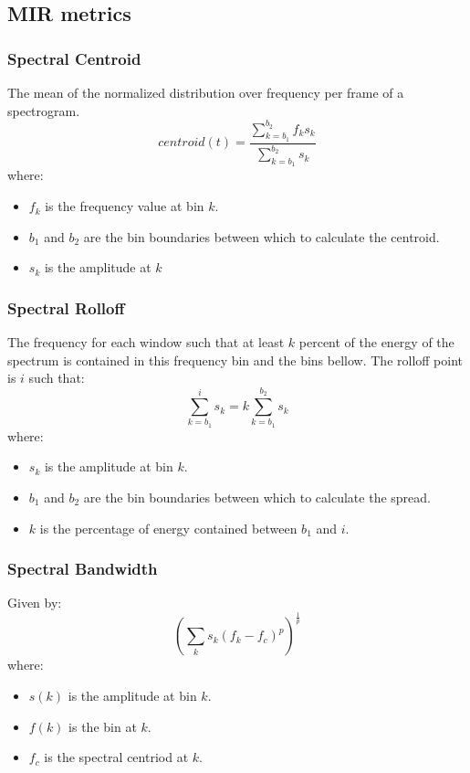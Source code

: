 \documentclass[a4paper, 12pt, twoside]{report}
\begin{document}
\subsection{MIR metrics} \label{mir}
\label{sec:org59595af}
\subsubsection{Spectral Centroid}
\label{sec:org722ed3e}

    The mean of the normalized distribution over frequency per frame of a spectrogram.
    \[ centroid(t) = \frac{\sum^{b_{2}}_{k=b_{1}}f_{k}s_{k}}{\sum^{b_{2}}_{k=b_{1}}s_{k}} \]
    where:
    \begin{itemize}
      \item $f_{k}$ is the frequency value at bin $k$.
      \item $b_{1}$ and $b_{2}$ are the bin boundaries between which to calculate the centroid.
      \item $s_{k}$ is the amplitude at $k$
    \end{itemize}

\subsubsection{Spectral Rolloff}
\label{sec:org8ba1512}

    The frequency for each window such that at least $k$ percent of the energy of the spectrum is contained in this frequency bin and the bins bellow. The rolloff point is $i$ such that:
    \[ \sum^{i}_{k=b_{1}}s_{k} = k\sum^{b_{2}}_{k=b_{1}}s_{k} \]
    where:
    \begin{itemize}
      \item $s_{k}$ is the amplitude at bin $k$.
      \item $b_{1}$ and $b_{2}$ are the bin boundaries between which to calculate the spread.
      \item $k$ is the percentage of energy contained between $b_{1}$ and $i$.
    \end{itemize}

\subsubsection{Spectral Bandwidth }
\label{sec:org9dcacf6}

    Given by:
    \[ (\sum_{k}s_{k}(f_{k} - f_{c})^{p})^{\frac{1}{p}}\]
    where:
    \begin{itemize}
      \item $s( k )$ is the amplitude at bin $k$.
      \item $f( k )$ is the bin at $k$.
      \item $f_{c}$ is the spectral centriod at $k$.
    \end{itemize}
\end{document}
